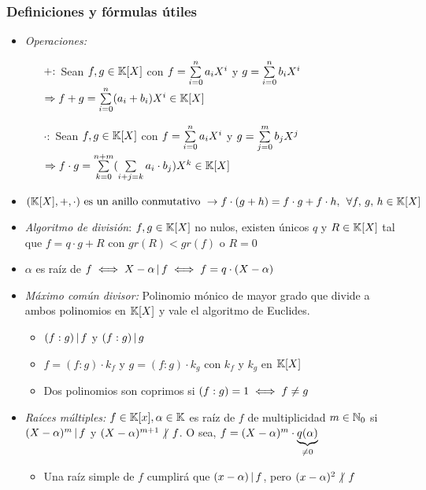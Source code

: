 \newcommand{\polGen}[1]{\sumatoria{i=0}{n} #1_i X^i}
\newcommand{\mult}[1]{\text{mult}(#1)}


\subsubsection*{Definiciones y fórmulas útiles}

\begin{itemize}
	\item \textit{Operaciones: }
	      \begin{itemize}
		      \item[$+:$] Sean $f,g \in \mathbb K[X]$ con $f = \polGen{a}$ y $g = \polGen{b}$\\
		            $\Rightarrow f + g = \sum\limits_{i=0}^{n} (a_i + b_i) X^i \in \mathbb K[X]$
		      \item[$\cdot:$] Sean $f,g \in \mathbb K[X]$ con $f = \polGen{a}$ y $g = \sum\limits_{j=0}^{m} b_j X^j$\\
		            $\Rightarrow f \cdot g = \sum\limits_{k=0}^{n+m} (\sum\limits_{i+j=k}^{} a_i \cdot b_j) X^k \in \mathbb K[X]$
	      \end{itemize}
	\item $(\mathbb K[X],+,\cdot) \text{ es un anillo conmutativo } \to f\cdot(g+h) = f\cdot g + f\cdot h,\, \;\forall f,\,g,\,h \in \mathbb K[X]$

	\item \textit{Algoritmo de división}: $f,g \in \mathbb K[X]$ no nulos, existen únicos $q$ y $R \in \mathbb K[X]$ tal que $f = q\cdot g + R$
	      con $gr(R) < gr(f)$ o $R = 0$

	\item $\alpha$ es raíz de $f \iff X - \alpha \, | \, f \iff f = q \cdot ( X - \alpha)$

	\item \textit{Máximo común divisor: } Polinomio mónico de mayor grado que divide a ambos polinomios en $\mathbb K[X]$
	      y vale el algoritmo de Euclides.
	      \begin{itemize}
		      \item $(f:g) \, | \, f$ y $(f:g) \, | \, g$

		      \item $f = (f:g)\cdot k_f$ y $g = (f:g)\cdot k_g$ con $k_f$ y $k_g$ en $\mathbb K[X]$

		      \item Dos polinomios son coprimos si $(f:g) = 1 \iff f \neq g$
	      \end{itemize}

	\item \textit{Raíces múltiples: } $f \in \mathbb K[x], \alpha \in \mathbb K$ es raíz de $f$ de multiplicidad
	      $m \in \mathbb N_0$ si $(X - \alpha)^m \, | \, f$ y $(X - \alpha)^{m+1} \noDivide f$.
	      O sea, $f = (X - \alpha)^m \cdot \underbrace{\textstyle q(\alpha)}_{\neq 0}$
	      \begin{itemize}
		      \item Una raíz simple de $f$ cumplirá que $(x-\alpha) \, | \, f$,
		            pero $(x - \alpha)^2 \noDivide f$
	      \end{itemize}


\end{itemize}
